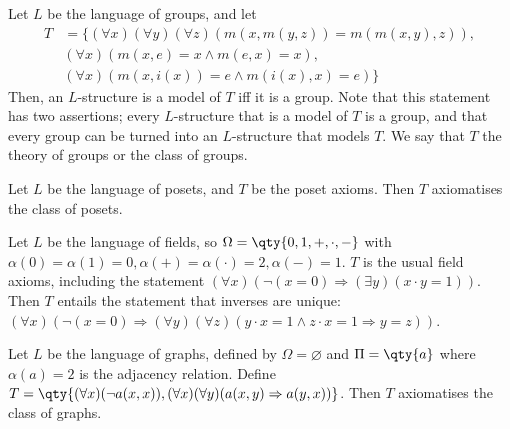 \begin{example}
    Let $L$ be the language of groups, and let
    \begin{align*}
        T &= \{(\forall x)(\forall y)(\forall z)(m(x,m(y,z)) = m(m(x,y), z)), \\
        &(\forall x)(m(x,e) = x \wedge m(e,x) = x), \\
        &(\forall x)(m(x,i(x)) = e \wedge m(i(x),x) = e)\}
    \end{align*}
    Then, an $L$-structure is a model of $T$ iff it is a group.
    Note that this statement has two assertions; every $L$-structure that is a model of $T$ is a group, and that every group can be turned into an $L$-structure that models $T$.
    We say that $T$  the theory of groups or the class of groups.
\end{example}

\begin{example}
    Let $L$ be the language of posets, and $T$ be the poset axioms.
    Then $T$ axiomatises the class of posets.
\end{example}

\begin{example}
    Let $L$ be the language of fields, so $\Omega = \qty{0, 1, +, \cdot, -}$ with $\alpha(0) = \alpha(1) = 0, \alpha(+) = \alpha(\cdot) = 2, \alpha(-) = 1$.
    $T$ is the usual field axioms, including the statement $(\forall x)(\neg (x = 0) \Rightarrow (\exists y)(x \cdot y = 1))$.
    Then $T$ entails the statement that inverses are unique: $(\forall x)(\neg (x = 0) \Rightarrow (\forall y)(\forall z) (y \cdot x = 1 \wedge z \cdot x = 1 \Rightarrow y = z))$.
\end{example}

\begin{example}
    Let $L$ be the language of graphs, defined by $\Omega = \varnothing$ and $\Pi = \qty{a}$ where $\alpha(a) = 2$ is the adjacency relation.
    Define $T = \qty{(\forall x)(\neg a(x,x)), (\forall x)(\forall y)(a(x,y) \Rightarrow a(y,x))}$.
    Then $T$ axiomatises the class of graphs.
\end{example}

